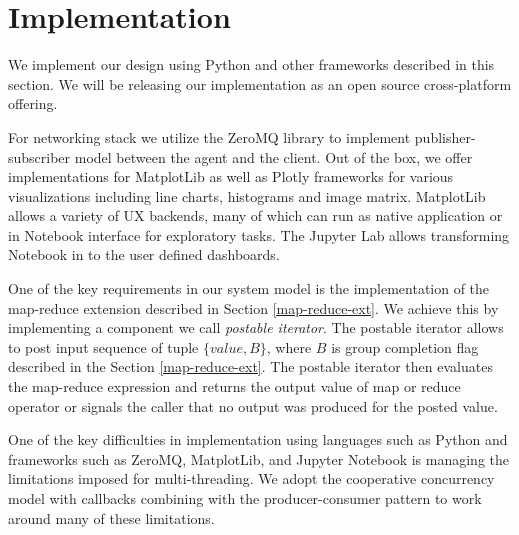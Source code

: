 \documentclass[sigchi]{acmart} %
\begin{document}
\section{Implementation}
We implement our design using Python and other frameworks described in this section. We will be releasing our implementation as an open source cross-platform offering.

For networking stack we utilize the ZeroMQ library to implement publisher-subscriber model between the agent and the client. Out of the box, we offer implementations for MatplotLib as well as Plotly frameworks for various visualizations including line charts, histograms and image matrix. MatplotLib allows a variety of UX backends, many of which can run as native application or in Notebook interface for exploratory tasks. The Jupyter Lab allows transforming Notebook in to the user defined dashboards.

One of the key requirements in our system model is the implementation of the map-reduce extension described in Section \ref{map-reduce-ext}. We achieve this by implementing a component we call \emph{postable iterator}. The postable iterator allows to post input sequence of tuple $\{value, B\}$, where $B$ is group completion flag described in the Section \ref{map-reduce-ext}. The postable iterator then evaluates the map-reduce expression and returns the output value of map or reduce operator or signals the caller that no output was produced for the posted value.

One of the key difficulties in implementation using languages such as Python and frameworks such as ZeroMQ, MatplotLib, and Jupyter Notebook is managing the limitations imposed for multi-threading. 
We adopt the cooperative concurrency model with callbacks combining with the producer-consumer pattern to work around many of these limitations. 


\end{document}
